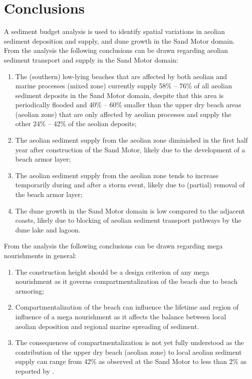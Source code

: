 \section{Conclusions}

A sediment budget analysis is used to identify spatial variations in
aeolian sediment deposition and supply, and dune growth in the Sand
Motor domain. From the analysis the following conclusions can be drawn
regarding aeolian sediment transport and supply in the Sand Motor
domain:

\begin{enumerate}
\item The (southern) low-lying beaches that are affected by both
  aeolian and marine processes (mixed zone) currently supply 58\% --
  76\% of all aeolian sediment deposits in the Sand Motor domain,
  despite that this area is periodically flooded and 40\% -- 60\%
  smaller than the upper dry beach areas (aeolian zone) that are only
  affected by aeolian processes and supply the other 24\% -- 42\% of
  the aeolian deposits;
\item The aeolian sediment supply from the aeolian zone diminished in
  the first half year after construction of the Sand Motor, likely due
  to the development of a beach armor layer;
\item The aeolian sediment supply from the aeolian zone tends to
  increase temporarily during and after a storm event, likely due to
  (partial) removal of the beach armor layer;
\item The dune growth in the Sand Motor domain is low compared to the
  adjacent coasts, likely due to blocking of aeolian sediment
  transport pathways by the dune lake and lagoon.
\end{enumerate}

\noindent From the analysis the following conclusions can be drawn
regarding mega nourishments in general:

\begin{enumerate}
\item The construction height should be a design criterion of any mega
  nourishment as it governs compartmentalization of the beach due to
  beach armoring;
\item Compartmentalization of the beach can influence the lifetime and
  region of influence of a mega nourishment as it affects the balance
  between local aeolian deposition and regional marine spreading of
  sediment.
\item The consequences of compartmentalization is not yet fully
  understood as the contribution of the upper dry beach (aeolian zone)
  to local aeolian sediment supply can range from 42\% as observed at
  the Sand Motor to less than 2\% as reported by \citet{Jackson2010}.
\end{enumerate}


